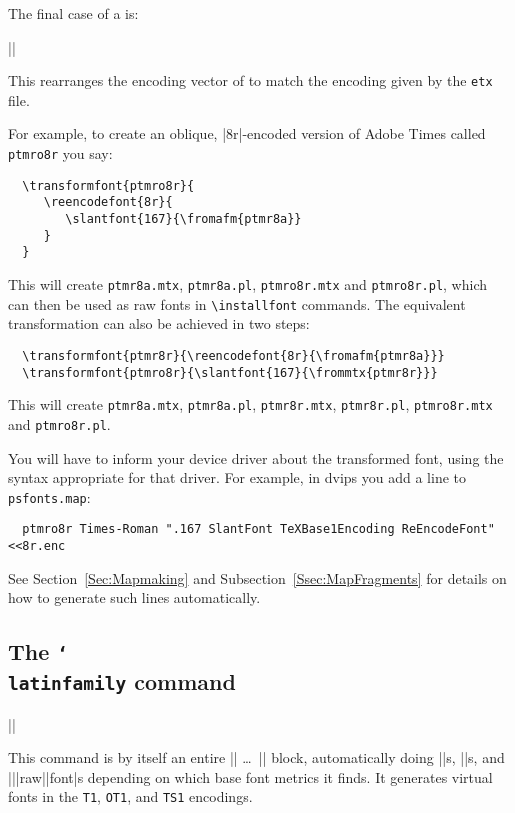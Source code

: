\documentclass[a4paper]{ltxguide}
\makeatletter
\newenvironment{decl*}[1][]{%
   \par
   \small
   \addvspace{2.3ex}%
   \vskip -\parskip
   \ifx\relax#1\relax
      \def\@decl@date{}%
   \else
      \def\@decl@date{\NEWfeature{#1}}%
   \fi
   \noindent\hspace{-\leftmargini}%
   \begin{tabular}{|l|}%
      \hline\ignorespaces
}{%
      \\\hline
   \end{tabular}%
   \nobreak\@decl@date\par\nobreak
   \vspace{2.3ex}\vskip -\parskip
}
\newcommand*{\marg}{\arg}
\newcommand*{\cs}[1]{\texttt{\char`\\ #1}\xspace}
\newcommand*{\setfilename}[1]{\texttt{#1}}
\newcommand*{\setpackagename}[1]{\textsf{#1}}
\newcommand{\dvips}   {\setpackagename{dvips}\xspace}
\newcommand{\etx}{\setfilename{etx}\xspace}
\makeatother
\begin{document}
The final case of a  is:
\begin{decl*}
  |\reencodefont|
\end{decl*}
This rearranges the encoding vector of  to match 
the encoding given by the \etx file.


For example, to create an oblique, |8r|-encoded version of Adobe Times
called \texttt{ptmro8r} you say:
\begin{verbatim}
  \transformfont{ptmro8r}{
     \reencodefont{8r}{
        \slantfont{167}{\fromafm{ptmr8a}}
     }
  }
\end{verbatim}
This will create \texttt{ptmr8a.mtx}, \texttt{ptmr8a.pl},
\texttt{ptmro8r.mtx} and \texttt{ptmro8r.pl}, which can then be used
as raw fonts in \verb|\installfont| commands.  The equivalent 
transformation can also be achieved in two steps:
\begin{verbatim}
  \transformfont{ptmr8r}{\reencodefont{8r}{\fromafm{ptmr8a}}}
  \transformfont{ptmro8r}{\slantfont{167}{\frommtx{ptmr8r}}}
\end{verbatim}
This will create \texttt{ptmr8a.mtx}, \texttt{ptmr8a.pl},
\texttt{ptmr8r.mtx}, \texttt{ptmr8r.pl}, \texttt{ptmro8r.mtx} and
\texttt{ptmro8r.pl}.

You will have to inform your device driver about the transformed font,
using the syntax appropriate for that driver.  For example, in \dvips
you add a line to \texttt{psfonts.map}:
\begin{verbatim}
  ptmro8r Times-Roman ".167 SlantFont TeXBase1Encoding ReEncodeFont" <<8r.enc
\end{verbatim}
See Section~\ref{Sec:Mapmaking} and 
Subsection~\ref{Ssec:MapFragments} for details on how to generate 
such lines automatically.


\subsection{The \cs{latinfamily} command}


\begin{decl}
  |\latinfamily|\marg{family}\marg{commands}
\end{decl}
This command is by itself an entire |\installfonts| \dots\ 
|\endinstallfonts| block, automatically doing |\transformfont|s, 
|\installfont|s, and |\install|\-|raw|\-|font|s depending on which 
base font metrics it finds. It generates virtual fonts in the 
\texttt{T1}, \texttt{OT1}, and \texttt{TS1} encodings.
\end{document}
